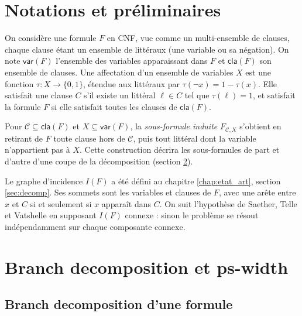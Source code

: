 \documentclass[11pt,a4paper]{report}
\theoremstyle{plain}
\theoremstyle{definition}
\begin{document}
\section{Notations et préliminaires}
\label{sec:theo-prelim}

On considère une formule $F$ en CNF, vue comme un multi-ensemble de
clauses, chaque clause étant un ensemble de littéraux (une variable
ou sa négation). On note $\mathsf{var}(F)$ l'ensemble des variables
apparaissant dans $F$ et $\mathsf{cla}(F)$ son ensemble de clauses.
Une affectation d'un ensemble de variables $X$ est une fonction
$\tau : X \to \{0,1\}$, étendue aux littéraux par
$\tau(\neg x) = 1 - \tau(x)$. Elle satisfait une clause $C$ s'il
existe un littéral $\ell \in C$ tel que $\tau(\ell) = 1$, et satisfait
la formule $F$ si elle satisfait toutes les clauses de
$\mathsf{cla}(F)$.

Pour $\mathcal{C} \subseteq \mathsf{cla}(F)$ et
$X \subseteq \mathsf{var}(F)$, la \emph{sous-formule induite}
$F_{\mathcal{C},X}$ s'obtient en retirant de $F$ toute clause hors de
$\mathcal{C}$, puis tout littéral dont la variable n'appartient pas
à $X$. Cette construction décrira les sous-formules de part et
d'autre d'une coupe de la décomposition (section \ref{sec:theo-pswidth}).

Le graphe d'incidence $I(F)$ a été défini au
chapitre \ref{chap:etat_art}, section \ref{sec:decomp}. Ses sommets
sont les variables et clauses de $F$, avec une arête entre $x$ et $C$
si et seulement si $x$ apparaît dans $C$. On suit l'hypothèse de
Saether, Telle et Vatshelle \cite{saether2015} en supposant $I(F)$
connexe : sinon le problème se résout indépendamment sur chaque
composante connexe.

\section{Branch decomposition et ps-width}
\label{sec:theo-pswidth}

\subsection{Branch decomposition d'une formule}
\label{ssec:theo-branch-decomp}
\end{document}
